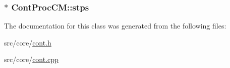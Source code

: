 \hypertarget{a00064_a5c5d9e8f0709600e603d41d1840bb134}{
\subsubsection[{stps}]{$\ast$ Cont\-Proc\-C\-M\-::stps\hspace{0.3cm}{\ttfamily [private]}}}\label{a00064_a5c5d9e8f0709600e603d41d1840bb134}


The documentation for this class was generated from the following files\-:\begin{DoxyCompactItemize}
\item 
src/core/\hyperlink{a00218}{cont.\-h}\item 
src/core/\hyperlink{a00217}{cont.\-cpp}\end{DoxyCompactItemize}
